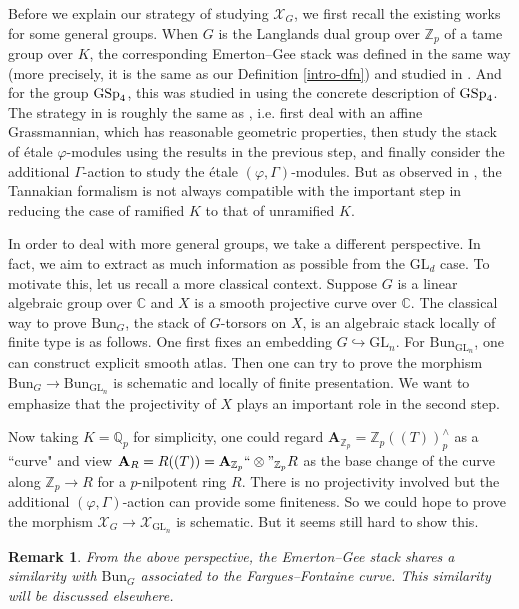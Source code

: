 \documentclass[10pt]{article}
\newtheorem{rmk}[thm]{Remark}
\numberwithin{equation}{section}
\newcommand{\bC}{{\mathbb C}}
\newcommand{\bQ}{{\mathbb Q}}
\newcommand{\bZ}{{\mathbb Z}}
\newcommand{\calX}{{\mathcal X}}
\newcommand{\Bun}{{\mathrm{Bun}}}           %
\newcommand{\GL}{{\mathrm{GL}}}             %
\newcommand{\bfA}{{\textbf{A}}}
\begin{document}
Before we explain our strategy of studying $\calX_G$, we first recall the existing works for some general groups. When $G$ is the Langlands dual group over $\bZ_p$ of a tame group over $K$, the corresponding Emerton--Gee stack was defined in the same way (more precisely, it is the same as our Definition \ref{intro-dfn}) and studied in \cite{Lin23}. And for the group ${\rm GSp}_4$, this was studied in \cite{Lee23} using the concrete description of ${\rm GSp}_4$. The strategy in \cite{Lin23} is roughly the same as \cite{EG22}, i.e. first deal with an affine Grassmannian, which has reasonable geometric properties, then study the stack of \'etale $\varphi$-modules using the results in the previous step, and finally consider the additional $\Gamma$-action to study the \'etale $(\varphi,\Gamma)$-modules. But as observed in \cite{Lin23}, the Tannakian formalism is not always compatible with the important step in \cite{EG22} reducing the case of ramified $K$ to that of unramified $K$.

In order to deal with more general groups, we take a different perspective. In fact, we aim to extract as much information as possible from the $\GL_d$ case. To motivate this, let us recall a more classical context. Suppose $G$ is a linear algebraic group over $\bC$ and $X$ is a smooth projective curve over $\bC$. The classical way to prove $\Bun_G$, the stack of $G$-torsors on $X$, is an algebraic stack locally of finite type is as follows. One first fixes an embedding $G\hookrightarrow \GL_n$. For $\Bun_{\GL_n}$, one can construct explicit smooth atlas. Then one can try to prove the morphism $\Bun_G\to \Bun_{\GL_n}$ is schematic and locally of finite presentation. We want to emphasize that the projectivity of $X$ plays an important role in the second step. 

Now taking $K=\bQ_p$ for simplicity, one could regard $\bfA_{\bZ_p}=\bZ_p((T))^\wedge_p$ as a ``curve" and view $\bfA_R=R((T))=\bfA_{\bZ_p}``\otimes"_{\bZ_p}R$ as the base change of the curve along $\bZ_p\to R$ for a $p$-nilpotent ring $R$. There is no projectivity involved but the additional $(\varphi,\Gamma)$-action can provide some finiteness. So we could hope to prove the morphism $\calX_G\to \calX_{\GL_n}$ is schematic. But it seems still hard to show this.

\begin{rmk}
    From the above perspective, the Emerton--Gee stack shares a similarity with $\Bun_G$ associated to the Fargues--Fontaine curve. This similarity will be discussed elsewhere.
\end{rmk}
\end{document}
